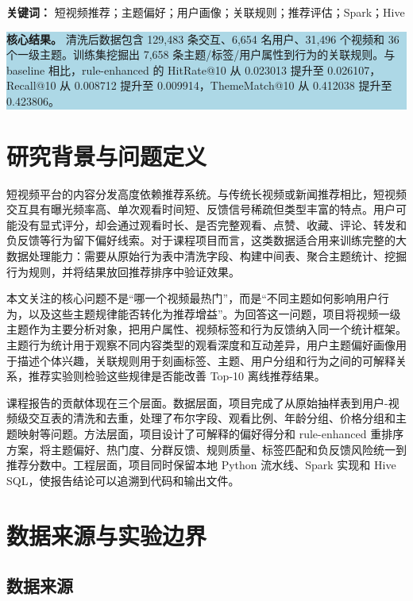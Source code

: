 \documentclass[UTF8,a4paper,12pt,fontset=none]{ctexart}
\begin{document}
\noindent\textbf{关键词：} 短视频推荐；主题偏好；用户画像；关联规则；推荐评估；Spark；Hive

\vspace{0.8em}
\noindent\colorbox{LightBlue}{\parbox{0.96\textwidth}{
\textbf{核心结果。}
清洗后数据包含 129,483 条交互、6,654 名用户、31,496 个视频和 36 个一级主题。训练集挖掘出 7,658 条主题/标签/用户属性到行为的关联规则。与 baseline 相比，rule-enhanced 的 HitRate@10 从 0.023013 提升至 0.026107，Recall@10 从 0.008712 提升至 0.009914，ThemeMatch@10 从 0.412038 提升至 0.423806。
}}

\newpage
\tableofcontents
\newpage

\section{研究背景与问题定义}

短视频平台的内容分发高度依赖推荐系统。与传统长视频或新闻推荐相比，短视频交互具有曝光频率高、单次观看时间短、反馈信号稀疏但类型丰富的特点。用户可能没有显式评分，却会通过观看时长、是否完整观看、点赞、收藏、评论、转发和负反馈等行为留下偏好线索。对于课程项目而言，这类数据适合用来训练完整的大数据处理能力：需要从原始行为表中清洗字段、构建中间表、聚合主题统计、挖掘行为规则，并将结果放回推荐排序中验证效果。

本文关注的核心问题不是“哪一个视频最热门”，而是“不同主题如何影响用户行为，以及这些主题规律能否转化为推荐增益”。为回答这一问题，项目将视频一级主题作为主要分析对象，把用户属性、视频标签和行为反馈纳入同一个统计框架。主题行为统计用于观察不同内容类型的观看深度和互动差异，用户主题偏好画像用于描述个体兴趣，关联规则用于刻画标签、主题、用户分组和行为之间的可解释关系，推荐实验则检验这些规律是否能改善 Top-10 离线推荐结果。

课程报告的贡献体现在三个层面。数据层面，项目完成了从原始抽样表到用户-视频级交互表的清洗和去重，处理了布尔字段、观看比例、年龄分组、价格分组和主题映射等问题。方法层面，项目设计了可解释的偏好得分和 rule-enhanced 重排序方案，将主题偏好、热门度、分群反馈、规则质量、标签匹配和负反馈风险统一到推荐分数中。工程层面，项目同时保留本地 Python 流水线、Spark 实现和 Hive SQL，使报告结论可以追溯到代码和输出文件。

\section{数据来源与实验边界}

\subsection{数据来源}
\end{document}
